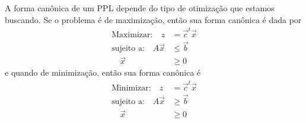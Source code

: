 A forma canônica de um PPL depende do tipo de otimização que estamos buscando.
Se o problema é de maximização, então sua forma canônica é dada por
\begin{align*}
\text{Maximizar:} \quad z & = \vec c^t \vec x \\
\text{sujeito a:} \quad A \vec x & \leq \vec b \\
				  \quad \vec x & \geq 0
\end{align*}
e quando de minimização, então sua forma canônica é
\begin{align*}
	\text{Minimizar:} \quad z & = \vec c^t \vec x \\
	\text{sujeito a:} \quad A\vec x  & \geq \vec b \\
	\quad  \vec x  & \geq 0
\end{align*}
